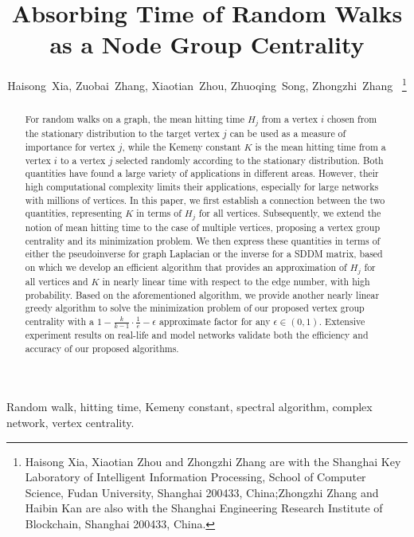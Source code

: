 \documentclass[journal]{IEEEtran}
\begin{document}
\title{Absorbing Time of Random Walks\\ as a Node Group Centrality}
\author{Haisong~Xia,
    Zuobai~Zhang,
    Xiaotian~Zhou,
    Zhuoqing~Song,
    Zhongzhi~Zhang~
    \thanks{Haisong Xia, Xiaotian Zhou and Zhongzhi Zhang are with the Shanghai Key Laboratory of Intelligent Information Processing, School of Computer Science, Fudan University, Shanghai 200433, China;Zhongzhi Zhang and Haibin Kan are also with the Shanghai Engineering Research Institute of Blockchain, Shanghai 200433, China.}
}

\maketitle

\begin{abstract}
    For random walks on a graph, the mean hitting time \(H_j\) from a vertex \(i\) chosen from the stationary distribution to the target vertex \(j\) can be used as a measure of importance for vertex \(j\), while the Kemeny constant \(K\) is the mean hitting time from a vertex \(i\) to a vertex \(j\) selected randomly according to the stationary distribution.
    Both quantities have found a large variety of applications in different areas.
    However, their high computational complexity limits their applications, especially for large networks with millions of vertices.
    In this paper, we first establish a connection between the two quantities, representing \(K\) in terms of \(H_j\) for all vertices.
    Subsequently, we extend the notion of mean hitting time to the case of multiple vertices, proposing a vertex group centrality and its minimization problem.
    We then express these quantities in terms of either the pseudoinverse for graph Laplacian or the inverse for a SDDM matrix, based on which we develop an efficient algorithm that provides an approximation of \(H_j\) for all vertices and \(K\) in nearly linear time with respect to the edge number, with high probability.
    Based on the aforementioned algorithm, we provide another nearly linear greedy algorithm to solve the minimization problem of our proposed vertex group centrality with a \(1-\frac{k}{k-1}\cdot\frac{1}{e}-\epsilon\) approximate factor for any \(\epsilon\in(0,1)\).
    Extensive experiment results on real-life and model networks validate both the efficiency and accuracy of our proposed algorithms.
\end{abstract}

\begin{IEEEkeywords}
    Random walk, hitting time, Kemeny constant, spectral algorithm, complex network, vertex centrality.
\end{IEEEkeywords}
\end{document}
